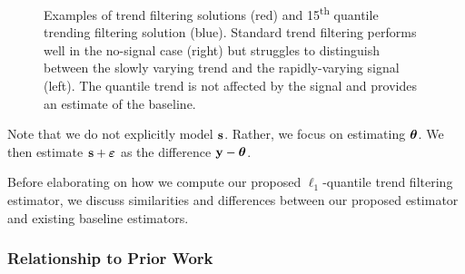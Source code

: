 \documentclass[12pt]{article}
\newcommand{\V}[1]{{\bm{\mathbf{\MakeLowercase{#1}}}}} %
\begin{document}
	\begin{figure}
		\centering
		\caption{Examples of trend filtering solutions (red) and 15\textsuperscript{th} quantile trending filtering solution (blue). Standard trend filtering performs well in the no-signal case (right) but struggles to distinguish between the slowly varying trend and the rapidly-varying signal (left). The quantile trend is not affected by the signal and provides an estimate of the baseline.}
	\end{figure}
	Note that we do not explicitly model $\V{s}$. Rather, we focus on estimating $\V{\theta}$. We then estimate $\V{s} + \V{\varepsilon}$ as the difference $\V{y} - \V{\theta}$.

	Before elaborating on how we compute our proposed $\ell_1$-quantile trend filtering estimator, we discuss similarities and differences between our proposed estimator and existing baseline estimators.

\subsubsection{Relationship to Prior Work}
\end{document}
